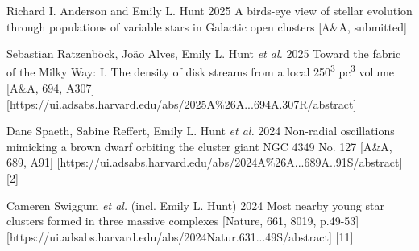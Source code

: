 \begin{etaremune}
    \item \publication 
        {Richard I. Anderson and Emily L. Hunt}
        {2025}
        {A birds-eye view of stellar evolution through populations of variable stars in Galactic open clusters}
        [A\&A, submitted]
    \item \publication 
        {Sebastian Ratzenböck, João Alves, Emily L. Hunt \emph{et al.}}
        {2025}
        {Toward the fabric of the Milky Way: I. The density of disk streams from a local 250\textsuperscript{3} pc\textsuperscript{3} volume}
        [A\&A, 694, A307]
        [https://ui.adsabs.harvard.edu/abs/2025A\%26A...694A.307R/abstract]
    \item \publication
        {Dane Spaeth, Sabine Reffert, Emily L. Hunt \emph{et al.}}
        {2024}
        {Non-radial oscillations mimicking a brown dwarf orbiting the cluster giant NGC 4349 No. 127}
        [A\&A, 689, A91]
        [https://ui.adsabs.harvard.edu/abs/2024A\%26A...689A..91S/abstract]
        [2]
    \item \publication
        {Cameren Swiggum \emph{et al.} (incl. Emily L. Hunt)}
        {2024}
        {Most nearby young star clusters formed in three massive complexes }
        [Nature, 661, 8019, p.49-53]
        [https://ui.adsabs.harvard.edu/abs/2024Natur.631...49S/abstract]
        [11]
\end{etaremune}
